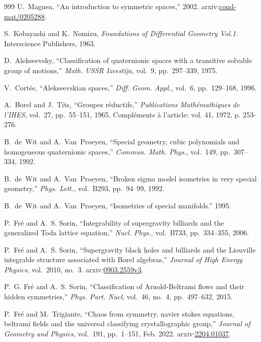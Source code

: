 \documentclass[10pt,a4paper]{article}
\begin{document}
\begin{thebibliography}{999}
U.~Magnea, ``An introduction to symmetric spaces,'' 2002.
\newblock arxiv:\href{http://arxiv.org/abs/cond-mat/0205288}{cond-mat/0205288}.

S.~Kobayashi and K.~Nomizu, {\em Foundations of Differential Geometry Vol.1}.
\newblock Interscience Publishers, 1963.

D.~Alekseevsky, ``Classification of quaternionic spaces with a transitive
  solvable group of motions,'' {\em Math. USSR Izvestija}, vol.~9,
  pp.~297--339, 1975.

V.~Cort{\'e}s, ``Alekseevskian spaces,'' {\em Diff. Geom. Appl.}, vol.~6,
  pp.~129--168, 1996.

A.~Borel and J.~Tits, ``Groupes r{\'e}ductifs,'' {\em Publications
  Math{\'e}mathiques de l'IHES}, vol.~27, pp.~55--151, 1965.
\newblock Compl{\'e}ments {\`a} l'article: vol. {41}, {1972}, p. 253-276.

B.~de~Wit and A.~Van~Proeyen, ``{Special geometry, cubic polynomials and
  homogeneous quaternionic spaces},'' {\em Commun. Math. Phys.}, vol.~149,
  pp.~307--334, 1992.

B.~de~Wit and A.~Van~Proeyen, ``{Broken sigma model isometries in very special
  geometry},'' {\em Phys. Lett.}, vol.~B293, pp.~94--99, 1992.

B.~de~Wit and A.~Van~Proeyen, ``{Isometries of special manifolds}.'' 1995.

P.~Fr{\'e} and A.~S. Sorin, ``{Integrability of supergravity billiards and the
  generalized Toda lattice equation},'' {\em Nucl. Phys.}, vol.~B733,
  pp.~334--355, 2006.

P.~Fr{\'{e}} and A.~S. Sorin, ``{S}upergravity black holes and billiards and
  the {L}iouville integrable structure associated with {B}orel algebras,'' {\em
  {J}ournal of {H}igh {E}nergy {P}hysics}, vol.~2010, no.~3.
\newblock arxiv:\href{https://arxiv.org/abs/0903.2559v3}{0903.2559v3}.

P.~G. Fr\'e and A.~S. Sorin, ``Classification of {A}rnold-{B}eltrami flows and
  their hidden symmetries,'' {\em Phys. Part. Nucl}, vol.~46, no.~4,
  pp.~497--632, 2015.

P.~Fr\'{e} and M.~Trigiante, ``Chaos from symmetry, navier stokes equations,
  beltrami fields and the universal classifying crystallographic group,'' {\em
  Journal of Geometry and Physics}, vol.~191, pp.~1--151, Feb. 2022.
\newblock arxiv:\href{https://arxiv.org/abs/2204.01037}{2204.01037}.


\end{thebibliography}
\end{document}
